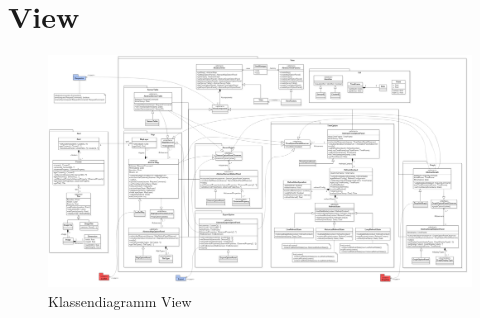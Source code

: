 \chapter{View}
\begin{figure}[!hbp]
	\centering\includegraphics[width=1.25\linewidth,angle=90]{images/view/ViewClassDiagram}
	\caption{Klassendiagramm View}
\end{figure}
